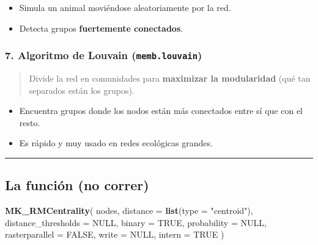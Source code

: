 \documentclass[
]{book}
\newenvironment{Shaded}{\begin{snugshade}}{\end{snugshade}}
\newcommand{\AttributeTok}[1]{\textcolor[rgb]{0.13,0.29,0.53}{#1}}
\newcommand{\ConstantTok}[1]{\textcolor[rgb]{0.56,0.35,0.01}{#1}}
\newcommand{\FunctionTok}[1]{\textcolor[rgb]{0.13,0.29,0.53}{\textbf{#1}}}
\newcommand{\NormalTok}[1]{#1}
\newcommand{\StringTok}[1]{\textcolor[rgb]{0.31,0.60,0.02}{#1}}
\providecommand{\tightlist}{%
  \setlength{\itemsep}{0pt}\setlength{\parskip}{0pt}}
\begin{document}
\begin{itemize}
\tightlist
\item
  Simula un animal moviéndose aleatoriamente por la red.
\item
  Detecta grupos \textbf{fuertemente conectados}.
\end{itemize}

\subsubsection{\texorpdfstring{7. Algoritmo de Louvain (\texttt{memb.louvain})}{7. Algoritmo de Louvain (memb.louvain)}}\label{algoritmo-de-louvain-memb.louvain}

\begin{quote}
Divide la red en comunidades para \textbf{maximizar la modularidad} (qué tan separados están los grupos).
\end{quote}

\begin{itemize}
\tightlist
\item
  Encuentra grupos donde los nodos están más conectados entre sí que con el resto.
\item
  Es rápido y muy usado en redes ecológicas grandes.
\end{itemize}

\begin{center}\rule{0.5\linewidth}{0.5pt}\end{center}

\subsection{La función (no correr)}\label{la-funciuxf3n-no-correr}

\begin{Shaded}
\begin{Highlighting}[]
\FunctionTok{MK\_RMCentrality}\NormalTok{(}
\NormalTok{  nodes,}
  \AttributeTok{distance =} \FunctionTok{list}\NormalTok{(}\AttributeTok{type =} \StringTok{"centroid"}\NormalTok{),}
  \AttributeTok{distance\_thresholds =} \ConstantTok{NULL}\NormalTok{,}
  \AttributeTok{binary =} \ConstantTok{TRUE}\NormalTok{,}
  \AttributeTok{probability =} \ConstantTok{NULL}\NormalTok{,}
  \AttributeTok{rasterparallel =} \ConstantTok{FALSE}\NormalTok{,}
  \AttributeTok{write =} \ConstantTok{NULL}\NormalTok{,}
  \AttributeTok{intern =} \ConstantTok{TRUE}
\NormalTok{)}
\end{Highlighting}
\end{Shaded}
\end{document}
